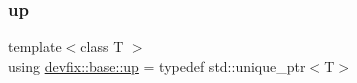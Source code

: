 \mbox{\label{namespacedevfix_1_1base_a18dfbd492717795cee1cfa6f14a8f724}} 
\subsubsection{\texorpdfstring{up}{up}}
{\footnotesize\ttfamily template$<$class T $>$ \\
using \hyperlink{namespacedevfix_1_1base_a18dfbd492717795cee1cfa6f14a8f724}{devfix\+::base\+::up} = typedef std\+::unique\+\_\+ptr$<$T$>$}


